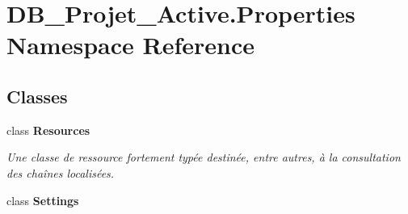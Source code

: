 \section{D\+B\+\_\+\+Projet\+\_\+\+Active.\+Properties Namespace Reference}
\label{namespace_d_b___projet___active_1_1_properties}
\subsection*{Classes}
\begin{DoxyCompactItemize}
\item 
class \textbf{ Resources}
\begin{DoxyCompactList}\small\item\em Une classe de ressource fortement typée destinée, entre autres, à la consultation des chaînes localisées. \end{DoxyCompactList}\item 
class \textbf{ Settings}
\end{DoxyCompactItemize}
